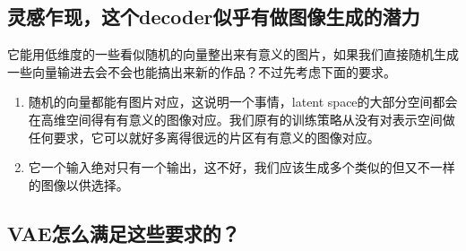 \documentclass[]{report}
\begin{document}
\subsection{灵感乍现，这个decoder似乎有做图像生成的潜力}
\indent 它能用低维度的一些看似随机的向量整出来有意义的图片，如果我们直接随机生成一些向量输进去会不会也能搞出来新的作品？不过先考虑下面的要求。
\begin{enumerate}
	\item 随机的向量都能有图片对应，这说明一个事情，latent space的大部分空间都会在高维空间得有有意义的图像对应。我们原有的训练策略从没有对表示空间做任何要求，它可以就好多离得很远的片区有有意义的图像对应。
	\item 它一个输入绝对只有一个输出，这不好，我们应该生成多个类似的但又不一样的图像以供选择。
\end{enumerate}
\subsection{VAE怎么满足这些要求的？}
\end{document}
